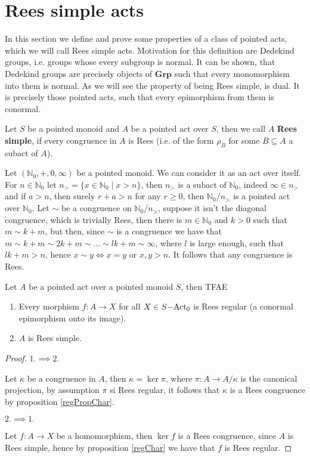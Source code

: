 \section{Rees simple acts}
    In this section we define and prove some properties of a class of pointed acts, which we will call Rees simple acts. Motivation for this 
    definition are Dedekind groups, i.e. groups whose every subgroup is normal. It can be shown, that Dedekind groups are precisely objects of $\mathbf{Grp}$
    such that every monomorphism into them is normal. As we will see the property of being Rees simple, is dual. It is precisely those pointed acts, such that 
    every epimorphism from them is conormal.
\begin{definition}
    Let $S$ be a pointed monoid and $A$ be a pointed act over $S$, then we call $A$
    \textbf{Rees simple}, if every congruence in $A$ is Rees (i.e. of the form $\rho_B$ for some $B\subseteq A$ a subact of $A$).
\end{definition}
\begin{example}
    Let $(\mathbb{N}_0, +, 0, \infty)$ be a pointed monoid. We can consider it as an act over itself. For $n\in\mathbb{N}_0$ let 
    $n_> = \{x\in\mathbb{N}_0 \mid x > n\}$, then $n_>$ is a subact of $\mathbb{N}_0$, indeed $\infty\in n_>$ and if $a > n$, then 
    surely $r+a > n$ for any $r \geq 0$, then $\mathbb{N}_0/n_>$ is a pointed act over $\mathbb{N}_0$. Let $\sim$ be a congruence on 
    $\mathbb{N}_0/n_>$, suppose it isn't the diagonal congruence, which is trivially Rees, then there is $m\in\mathbb{N}_0$ and $k>0$ such that 
    $m\sim k+m$, but then, since $\sim$ is a congruence we have that $m\sim k+m\sim 2k+m \sim\dots \sim lk+m \sim \infty$, where $l$
    is large enough, such that $lk+m > n$, hence $x\sim y \iff x=y$ or $x,y > n$. It follows that any congruence is Rees. 
\end{example}
\begin{proposition}
    Let $A$ be a pointed act over a pointed monoid $S$, then TFAE
    \begin{enumerate}
        \item Every morphism $f: A \to X$ for all $X\in S\mathrm{-Act}_0$ is Rees regular (a conormal epimorphism onto its image).
        \item $A$ is Rees simple.
    \end{enumerate}
\end{proposition}
\begin{proof}[Proof]
    $1. \implies 2.$\par 
    Let $\kappa$ be a congruence in $A$, then $\kappa=\ker{\pi}$, where $\pi: A \to A/\kappa$ is the canonical projection, by 
    assumption $\pi$ si Rees regular, it follows that $\kappa$ is a Rees congruence by proposition \ref{regPropChar}. \par 
    $2. \implies 1.$\par 
    Let $f: A\to X$ be a homomorphism, then $\ker{f}$ is a Rees congruence, since $A$ is Rees simple, hence by proposition \ref{regChar} 
    we have that $f$ is Rees regular.
\end{proof}
